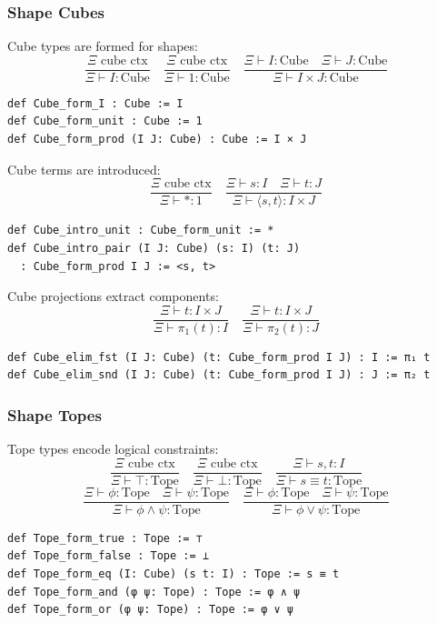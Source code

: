 \documentclass{article}
\begin{document}
\subsubsection{Shape Cubes}

\begin{definition}
Cube types are formed for shapes:
\[
\frac{\Xi \text{ cube ctx}}{\Xi \vdash I : \text{Cube}} \quad \frac{\Xi \text{ cube ctx}}{\Xi \vdash 1 : \text{Cube}} \quad \frac{\Xi \vdash I : \text{Cube} \quad \Xi \vdash J : \text{Cube}}{\Xi \vdash I \times J : \text{Cube}}
\]
\begin{lstlisting}[mathescape=true]
def Cube_form_I : Cube := I
def Cube_form_unit : Cube := 1
def Cube_form_prod (I J: Cube) : Cube := I × J
\end{lstlisting}
\end{definition}

\begin{definition}
Cube terms are introduced:
\[
\frac{\Xi \text{ cube ctx}}{\Xi \vdash * : 1} \quad \frac{\Xi \vdash s : I \quad \Xi \vdash t : J}{\Xi \vdash \langle s, t \rangle : I \times J}
\]
\begin{lstlisting}[mathescape=true]
def Cube_intro_unit : Cube_form_unit := *
def Cube_intro_pair (I J: Cube) (s: I) (t: J)
  : Cube_form_prod I J := <s, t>
\end{lstlisting}
\end{definition}

\begin{definition}
Cube projections extract components:
\[
\frac{\Xi \vdash t : I \times J}{\Xi \vdash \pi_1(t) : I} \quad \frac{\Xi \vdash t : I \times J}{\Xi \vdash \pi_2(t) : J}
\]
\begin{lstlisting}[mathescape=true]
def Cube_elim_fst (I J: Cube) (t: Cube_form_prod I J) : I := π₁ t
def Cube_elim_snd (I J: Cube) (t: Cube_form_prod I J) : J := π₂ t
\end{lstlisting}
\end{definition}

\newpage
\subsubsection{Shape Topes}

\begin{definition}
Tope types encode logical constraints:
\[
\frac{\Xi \text{ cube ctx}}{\Xi \vdash \top : \text{Tope}} \quad \frac{\Xi \text{ cube ctx}}{\Xi \vdash \bot : \text{Tope}} \quad \frac{\Xi \vdash s, t : I}{\Xi \vdash s \equiv t : \text{Tope}}
\]
\[
\frac{\Xi \vdash \phi : \text{Tope} \quad \Xi \vdash \psi : \text{Tope}}{\Xi \vdash \phi \wedge \psi : \text{Tope}} \quad \frac{\Xi \vdash \phi : \text{Tope} \quad \Xi \vdash \psi : \text{Tope}}{\Xi \vdash \phi \vee \psi : \text{Tope}}
\]
\begin{lstlisting}[mathescape=true]
def Tope_form_true : Tope := ⊤
def Tope_form_false : Tope := ⊥
def Tope_form_eq (I: Cube) (s t: I) : Tope := s ≡ t
def Tope_form_and (φ ψ: Tope) : Tope := φ ∧ ψ
def Tope_form_or (φ ψ: Tope) : Tope := φ ∨ ψ
\end{lstlisting}
\end{definition}
\end{document}
